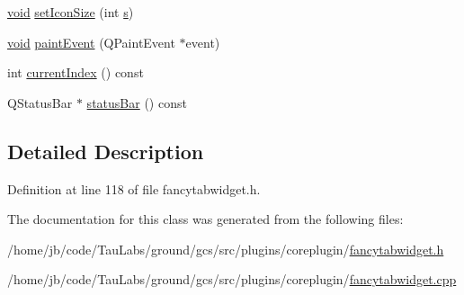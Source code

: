 \begin{DoxyCompactItemize}
\item 
\hyperlink{group___u_a_v_objects_plugin_ga444cf2ff3f0ecbe028adce838d373f5c}{void} \hyperlink{group___core_plugin_ga7e3a5a0488562dbba9f376378b8ff89f}{set\-Icon\-Size} (int \hyperlink{uavobjecttemplate_8m_a3691308f2a4c2f6983f2880d32e29c84}{s})
\item 
\hyperlink{group___u_a_v_objects_plugin_ga444cf2ff3f0ecbe028adce838d373f5c}{void} \hyperlink{group___core_plugin_ga7f3bc1d5a3bdac8f7944f9970d2756eb}{paint\-Event} (\-Q\-Paint\-Event $\ast$event)
\item 
int \hyperlink{group___core_plugin_ga472485c9f09c372639cad92656a6d73b}{current\-Index} () const 
\item 
\-Q\-Status\-Bar $\ast$ \hyperlink{group___core_plugin_ga5581f5fbc90b13a3ddbca61c0dba433c}{status\-Bar} () const 
\end{DoxyCompactItemize}


\subsection{\-Detailed \-Description}


\-Definition at line 118 of file fancytabwidget.\-h.



\-The documentation for this class was generated from the following files\-:\begin{DoxyCompactItemize}
\item 
/home/jb/code/\-Tau\-Labs/ground/gcs/src/plugins/coreplugin/\hyperlink{coreplugin_2fancytabwidget_8h}{fancytabwidget.\-h}\item 
/home/jb/code/\-Tau\-Labs/ground/gcs/src/plugins/coreplugin/\hyperlink{coreplugin_2fancytabwidget_8cpp}{fancytabwidget.\-cpp}\end{DoxyCompactItemize}
